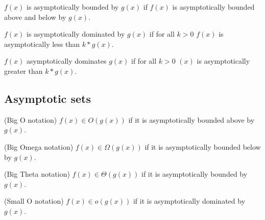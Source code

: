 \begin{definition}
    \label{def:asymp_bounded}
    \leanok
    $f(x)$ is asymptotically bounded by $g(x)$ if $f(x)$ is asymptotically bounded
    above and below by $g(x)$.
\end{definition}

\begin{definition}
    \label{def:asymp_right_dom}
    \leanok
    $f(x)$ is asymptotically dominated by $g(x)$ if for all $k > 0$ $f(x)$ is asymptotically 
    less than $k*g(x)$.

\end{definition}

\begin{definition}
    \label{def:asymp_left_dom}
    \leanok
    $f(x)$ asymptotically dominates $g(x)$ if for all $k > 0$ $(x)$ is asymptotically
    greater than $k*g(x)$.

\end{definition}


\subsection{Asymptotic sets}

\begin{definition}(Big O notation)
    \label{def:big_o}
    \leanok
    $f(x) \in O(g(x))$ if it is asymptotically bounded above by $g(x)$.
\end{definition}

\begin{definition}(Big Omega notation)
    \label{def:big_omega}
    \leanok
    $f(x) \in \Omega(g(x))$ if it is asymptotically bounded below by $g(x)$.
\end{definition}

\begin{definition}(Big Theta notation)
    \label{def:big_theta}
    \leanok
    $f(x) \in \Theta(g(x))$ if it is asymptotically bounded by $g(x)$. 
\end{definition}

\begin{definition}(Small O notation)
    \label{def:small_o}
    \leanok
    $f(x) \in o(g(x))$ if it is asymptotically dominated by $g(x)$.
\end{definition}

